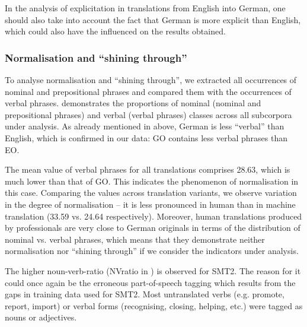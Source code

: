 \documentclass[output=paper]{LSP/langsci}
\begin{document}
In the analysis of explicitation in translations from English into German, one should also take into account the fact that German is more explicit than English, which could also have the influenced on the results obtained.

\subsubsection{Normalisation and “shining through”}
 
To analyse normalisation and “shining through”, we extracted all occurrences of nominal and prepositional phrases and compared them with the occurrences of verbal phrases.  demonstrates the proportions of nominal (nominal and prepositional phrases) and verbal (verbal phrases) classes across all subcorpora under analysis. As already mentioned in  above, German is less “verbal” than English, which is confirmed in our data: GO contains less verbal phrases than EO.

The mean value of verbal phrases for all translations comprises 28.63, which is much lower than that of GO. This indicates the phenomenon of normalisation in this case. Comparing the values across translation variants, we observe variation in the degree of normalisation – it is less pronounced in human than in machine translation (33.59 vs. 24.64 respectively).  Moreover, human translations produced by professionals are very close to German originals in terms of the distribution of nominal vs. verbal phrases, which means that they demonstrate neither normalisation nor “shining through” if we consider the indicators under analysis.

The higher noun-verb-ratio (NVratio in ) is observed for SMT2. The reason for it could once again be the erroneous part-of-speech tagging which results from the gaps in training data used for SMT2. Most untranslated verbs (e.g. promote, report, import) or verbal forms (recognising, closing, helping, etc.) were tagged as nouns or adjectives.
\end{document}
